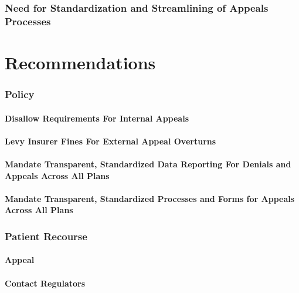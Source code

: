 \documentclass[12pt, a4paper,twoside]{report}
\theoremstyle{plain} %
\theoremstyle{definition} %
\theoremstyle{remark} %
\numberwithin{equation}{chapter}
\begin{document}
		\subsection{Need for Standardization and Streamlining of Appeals Processes}
		
		\chapter{Recommendations}\label{recommendations}
		
		\subsection{Policy}
		
		\subsubsection{Disallow Requirements For Internal Appeals}
		
		\subsubsection{Levy Insurer Fines For External Appeal Overturns}
		
		\subsubsection{Mandate Transparent, Standardized Data Reporting For Denials and Appeals Across All Plans}
		
		\subsubsection{Mandate Transparent, Standardized Processes and Forms for Appeals Across All Plans}
		
		\subsection{Patient Recourse}
		
		\subsubsection{Appeal}
		
		\subsubsection{Contact Regulators}
		
\end{document}
